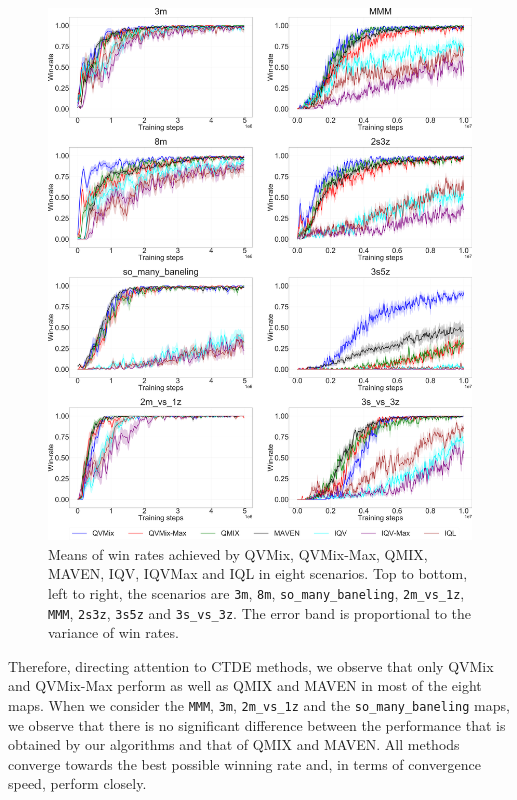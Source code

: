 \begin{figure}
\centering
\includegraphics[width=.95\linewidth]{tex_thesis/figures/ch4/all_win.pdf}
\caption{Means of win rates achieved by QVMix, QVMix-Max, QMIX, MAVEN, IQV, IQVMax and IQL in eight scenarios. Top to bottom, left to right, the scenarios are \texttt{3m}, \texttt{8m}, \texttt{so\_many\_baneling}, \texttt{2m\_vs\_1z}, \texttt{MMM}, \texttt{2s3z}, \texttt{3s5z} and \texttt{3s\_vs\_3z}. The error band is proportional to the variance of win rates.}
\label{fig:all_win_curves}
\end{figure}

Therefore, directing attention to CTDE methods, we observe that only QVMix and QVMix-Max perform as well as QMIX and MAVEN in most of the eight maps.
When we consider the \texttt{MMM}, \texttt{3m}, \texttt{2m\_vs\_1z} and the \texttt{so\_many\_baneling} maps, we observe that there is no significant difference between the performance that is obtained by our algorithms and that of QMIX and MAVEN. 
All methods converge towards the best possible winning rate and, in terms of convergence speed, perform closely.

